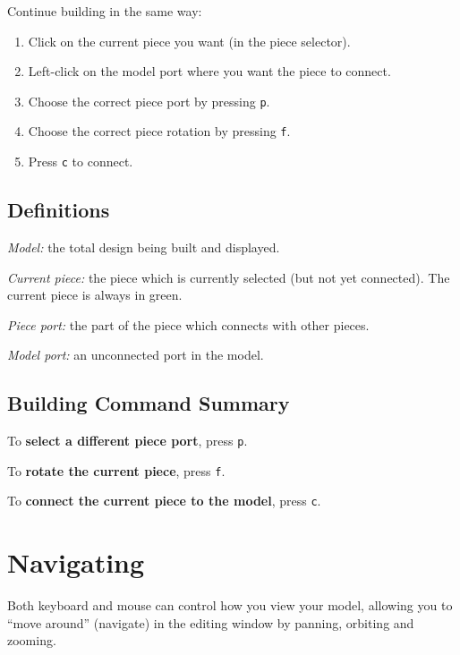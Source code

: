 \documentclass[12pt]{report}
\begin{document}
Continue building in the same way: 

\begin{enumerate}

  \item Click on the current piece you want (in the piece selector).
  \item Left-click on the model port where you want the piece to connect.
  \item Choose the correct piece port by pressing {\tt p}.
  \item Choose the correct piece rotation by pressing {\tt f}.
  \item Press {\tt c} to connect.

\end{enumerate}

\subsection{Definitions}
\begin{list}{}{}
  \item \emph{Model:} the total design being built and displayed.
  \item \emph{Current piece:} the piece which is currently selected
    (but not yet connected).  The current piece is always in green.
  \item \emph{Piece port:} the part of the piece which connects with other
    pieces.
  \item \emph{Model port:} an unconnected port in the model.
\end{list}

\subsection{Building Command Summary}
\begin{list}{}{}
  \item To \textbf{select a different piece port}, press {\tt p}.
  \item To \textbf{rotate the current piece}, press {\tt f}.
  \item To \textbf{connect the current piece to the model}, press {\tt c}.
\end{list}

\section{Navigating}

Both keyboard and mouse can control how you view your model, allowing
you to ``move around'' (navigate) in the editing window by panning,
orbiting and zooming.
\end{document}

